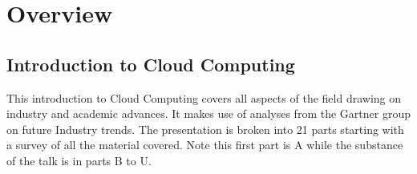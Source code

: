 \chapter{Overview}
\label{s:overview}

\FILENAME

\section{Introduction to Cloud Computing}
\label{s:icloud-fundamentals}

This introduction to Cloud Computing covers all aspects of the field drawing on industry and academic advances. It makes use of analyses from the Gartner group on future Industry trends. The presentation is broken into 21 parts starting with a survey of all the material covered. Note this first part is A while the substance of the talk is in parts B to U. 


%


